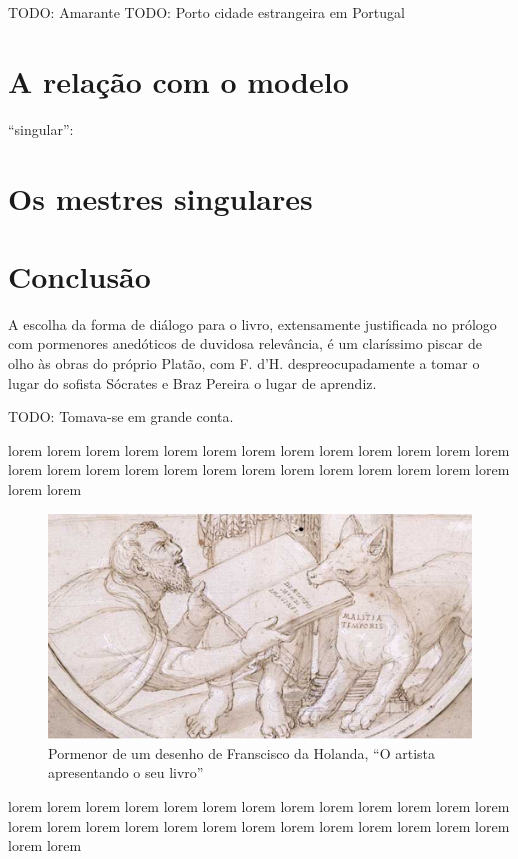 \documentclass{article}
\begin{document}
TODO: Amarante
TODO: Porto cidade estrangeira em Portugal

\section{A relação com o modelo}

``singular''\cite[pxx]{holanda}:

\begin{quote}
\end{quote}

\section{Os mestres singulares}

\section{Conclusão}

A escolha da forma de diálogo para o livro, extensamente justificada
no prólogo com pormenores anedóticos de duvidosa relevância, é um
claríssimo piscar de olho às obras do próprio Platão, com
F. d'H. despreocupadamente a tomar o lugar do sofista Sócrates e Braz
Pereira o lugar de aprendiz.

TODO:  Tomava-se em grande conta.

lorem lorem lorem lorem lorem lorem lorem lorem lorem lorem lorem
lorem lorem lorem lorem lorem lorem lorem lorem lorem lorem lorem
lorem lorem lorem lorem lorem lorem

\begin{figure}
\centering\includegraphics[height=0.3\textheight,keepaspectratio]
                          {images/malatia-temporis.png}
  \caption{Pormenor de um desenho de Franscisco da Holanda, ``O
    artista apresentando o seu livro''}
  \label{fig:1}
\end{figure}

lorem lorem lorem lorem lorem lorem lorem lorem lorem lorem lorem
lorem lorem lorem lorem lorem lorem lorem lorem lorem lorem lorem
lorem lorem lorem lorem lorem lorem

\printbibliography[heading=bibliography,title={Bibliografia}]
\end{document}
